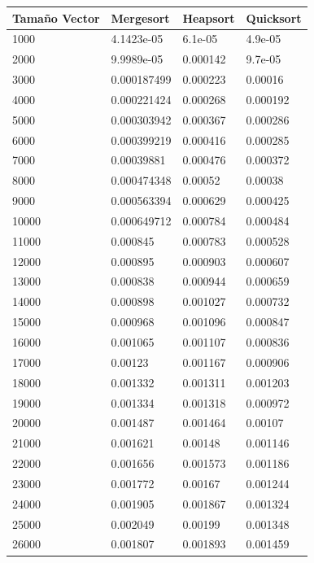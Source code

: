 \documentclass[a4paper, 11pt]{article}
\begin{document}
\begin{tabular}{@{}llll@{}}
\toprule
Tamaño Vector & Mergesort   & Heapsort & Quicksort \\ \midrule
1000          & 4.1423e-05  & 6.1e-05  & 4.9e-05   \\
2000          & 9.9989e-05  & 0.000142 & 9.7e-05   \\
3000          & 0.000187499 & 0.000223 & 0.00016   \\
4000          & 0.000221424 & 0.000268 & 0.000192  \\
5000          & 0.000303942 & 0.000367 & 0.000286  \\
6000          & 0.000399219 & 0.000416 & 0.000285  \\
7000          & 0.00039881  & 0.000476 & 0.000372  \\
8000          & 0.000474348 & 0.00052  & 0.00038   \\
9000          & 0.000563394 & 0.000629 & 0.000425  \\
10000         & 0.000649712 & 0.000784 & 0.000484  \\
11000         & 0.000845    & 0.000783 & 0.000528  \\
12000         & 0.000895    & 0.000903 & 0.000607  \\
13000         & 0.000838    & 0.000944 & 0.000659  \\
14000         & 0.000898    & 0.001027 & 0.000732  \\
15000         & 0.000968    & 0.001096 & 0.000847  \\
16000         & 0.001065    & 0.001107 & 0.000836  \\
17000         & 0.00123     & 0.001167 & 0.000906  \\
18000         & 0.001332    & 0.001311 & 0.001203  \\
19000         & 0.001334    & 0.001318 & 0.000972  \\
20000         & 0.001487    & 0.001464 & 0.00107   \\
21000         & 0.001621    & 0.00148  & 0.001146  \\
22000         & 0.001656    & 0.001573 & 0.001186  \\
23000         & 0.001772    & 0.00167  & 0.001244  \\
24000         & 0.001905    & 0.001867 & 0.001324  \\
25000         & 0.002049    & 0.00199  & 0.001348  \\
26000         & 0.001807    & 0.001893 & 0.001459  \\

\end{tabular}
\end{document}
